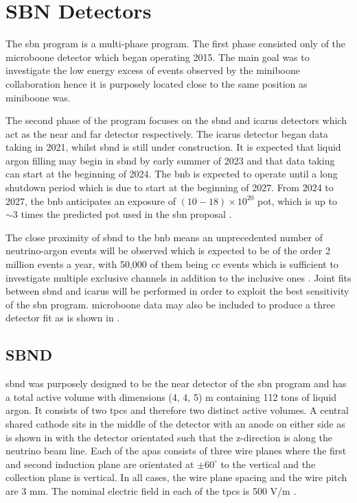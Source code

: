 \section{SBN Detectors}\label{sec:sbn_detectors}
The \gls{sbn} program is a multi-phase program. The first phase consisted only of the \gls{microboone} detector which began
operating 2015. The main goal was to investigate the low energy excess of events observed by the \gls{miniboone} collaboration hence it is purposely located close to the same position as \gls{miniboone} was.

The second phase of the program focuses on the \gls{sbnd} and \gls{icarus} detectors which act as the near and far detector respectively. The \gls{icarus} detector began data taking in 2021, whilst \gls{sbnd} is still under construction. It is expected that liquid argon filling may begin in \gls{sbnd} by early summer of 2023 and that data taking can start at the beginning of 2024. The \gls{bnb} is expected to operate until a long shutdown period which is due to start at the beginning of 2027. From 2024 to 2027, the \gls{bnb} anticipates an exposure of $(10-18) \times 10^{20}$ \gls{pot}, which is up to $\sim3$ times the predicted \gls{pot} used in the \gls{sbn} proposal \cite{sbnd_pot}.

The close proximity of \gls{sbnd} to the \gls{bnb} means an unprecedented number of neutrino-argon events will be observed which is expected to be of the order 2 million events a year, with 50,000 of them being \nue \gls{cc} events which is sufficient to investigate multiple exclusive channels in addition to the inclusive ones \cite{sbnd_pot}. Joint fits between \gls{sbnd} and \gls{icarus} will be performed in order to exploit the best sensitivity of the \gls{sbn} program. \gls{microboone} data may also be included to produce a three detector fit as is shown in . 


\subsection{SBND}\label{sec:SBND}

\gls{sbnd} was purposely designed to be the near detector of the \gls{sbn} program and has a total active volume with dimensions (4, 4, 5) m containing 112 tons of liquid argon. It consists of two \glspl{tpc} and therefore two distinct active volumes. A central shared cathode sits in the middle of the detector with an anode on either side as is shown in  with the detector orientated such that the z-direction is along the neutrino beam line. Each of the \glspl{apa} consists of three wire planes where the first and second induction plane are orientated at $\pm 60^{\circ}$ to the vertical and the collection plane is vertical. In all cases, the wire plane spacing and the wire pitch are 3 mm. The nominal electric field in each of the \glspl{tpc} is 500 V/m \cite{SBN_Proposal}. 

